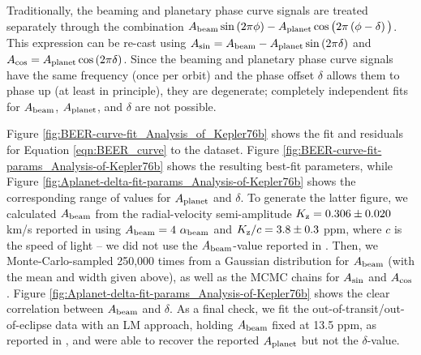 \documentclass[manuscript]{aastex62}
\begin{document}
Traditionally, the beaming and planetary phase curve signals are treated separately through the combination $A_{\rm beam} \sin \left(2 \pi\phi \right) - A_{\rm planet} \cos \big(2\pi \left( \phi - \delta \right)\big)$. This expression can be re-cast using $A_{\rm sin} = A_{\rm beam} - A_{\rm planet} \sin \left( 2 \pi \delta \right)$ and $A_{\rm cos} = A_{\rm planet} \cos \left( 2 \pi \delta \right)$. Since the beaming and planetary phase curve signals have the same frequency (once per orbit) and the phase offset $\delta$ allows them to phase up (at least in principle), they are degenerate; completely independent fits for $A_{\rm beam}$, $A_{\rm planet}$, and $\delta$ are not possible.

Figure \ref{fig:BEER-curve-fit_Analysis_of_Kepler76b} shows the fit and residuals for Equation \ref{eqn:BEER_curve} to the dataset. Figure \ref{fig:BEER-curve-fit-params_Analysis-of-Kepler76b} shows the resulting best-fit parameters, while Figure \ref{fig:Aplanet-delta-fit-params_Analysis-of-Kepler76b} shows the corresponding range of values for $A_{\rm planet}$ and $\delta$. To generate the latter figure, we calculated $A_{\rm beam}$ from the radial-velocity semi-amplitude $K_{\rm z} = 0.306 \pm 0.020$ km/s reported in \citet{2013ApJ...771...26F} using $A_{\rm beam} = 4\ \alpha_{\rm beam}$ and $K_{\rm z}/c = 3.8 \pm 0.3$ ppm, where $c$ is the speed of light \citep{2003ApJ...588L.117L} -- we did not use the $A_{\rm beam}$-value reported in \citet{2013ApJ...771...26F}. Then, we Monte-Carlo-sampled 250,000 times from a Gaussian distribution for $A_{\rm beam}$ (with the mean and width given above), as well as the MCMC chains for $A_{\rm sin}$ and $A_{\rm cos}$. Figure \ref{fig:Aplanet-delta-fit-params_Analysis-of-Kepler76b} shows the clear correlation between $A_{\rm beam}$ and $\delta$. As a final check, we fit the out-of-transit/out-of-eclipse data with an LM approach, holding $A_{\rm beam}$ fixed at 13.5 ppm, as reported in \citet{2013ApJ...771...26F}, and were able to recover the reported $A_{\rm planet}$ but not the $\delta$-value. 
\end{document}
